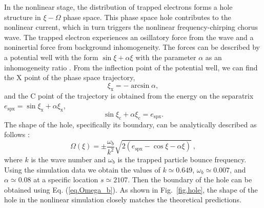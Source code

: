 In the nonlinear stage, the distribution of trapped electrons forms a  hole structure in $\xi-\Omega$ phase space. This phase space hole contributes to the nonlinear current, which in turn triggers the nonlinear frequency-chirping chorus wave. 
The trapped electron experiences  an osillatory force from the wave and a noninertial force from background inhomogeneity. The forces can be described by a potential well with the form $\sin \xi + \alpha \xi$ with the parameter $\alpha$ as an inhomogeneity ratio \cite{omura2008,tao2020}.
From 
the inflection point of the potential well,
we can find the X point of the phase space trajectory, 
\begin{equation}
    \xi_\mathrm{x} = - \arcsin \alpha,
\end{equation}
and the C point of the trajectory is obtained from the energy on the separatrix $e_\mathrm{spx} = \sin \xi_\mathrm{x} + \alpha \xi_\mathrm{x}$,
\begin{equation}
    \sin \xi_\mathrm{c} + \alpha \xi_\mathrm{c} = e_\mathrm{spx}.
\end{equation}
The shape of the hole, specifically its boundary, can be analytically described as follows \cite{omura2008}:
\begin{equation}\label{eq.Omega_b}
    \Omega(\xi) = \pm \frac{\omega_b}{k^2} \sqrt{2 (e_\mathrm{spx}-\cos \xi - \alpha \xi)}~,
\end{equation}
where $k$ is the wave number and $\omega_b$
is the trapped particle bounce frequency.
Using
the simulation data we obtain the values of $k \simeq 0.649$, $\omega_b \simeq 0.007$, and $\alpha \simeq 0.08$ at a specific location $s\simeq 2107$. Then the boundary of the hole can be obtained using Eq. (\ref{eq.Omega_b}).
As shown 
in Fig.~\ref{fig.hole},
the shape of the hole in the nonlinear simulation
closely matches  the theoretical predictions.

